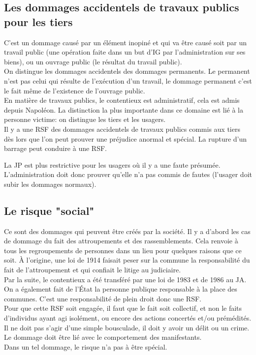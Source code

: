 \documentclass[10pt, a4paper, openany]{book}
\begin{document}
\subsection{Les dommages accidentels de travaux publics pour les tiers}

C'est un dommage causé par un élément inopiné et qui va être causé soit par un travail public (une opération faite dans un but d'IG par l'administration sur ses biens), ou un ouvrage public (le résultat du travail public). \\
On distingue les dommages accidentels des dommages permanents. Le permanent n'est pas celui qui résulte de l'exécution d'un travail, le dommage permanent c'est le fait même de l'existence de l'ouvrage public. \\
En matière de travaux publics, le contentieux est administratif, cela est admis depuis Napoléon. La distinction la plus importante dans ce domaine est lié à la personne victime: on distingue les tiers et les usagers. \\
Il y a une RSF des dommages accidentels de travaux publics commis aux tiers dès lors que l'on peut prouver une préjudice anormal et spécial. La rupture d'un barrage peut conduire à une RSF.


La JP est plus restrictive pour les usagers où il y a une faute présumée. L'administration doit donc prouver qu'elle n'a pas commis de fautes (l'usager doit subir les dommages normaux). \\

\subsection{Le risque "social"}

Ce sont des dommages qui peuvent être créés par la société. Il y a d'abord les cas de dommage du fait des attroupements et des rassemblements. Cela renvoie à tous les regroupements de personnes dans un lieu pour quelques raisons que ce soit. À l'origine, une loi de 1914 faisait peser sur la commune la responsabilité du fait de l'attroupement et qui confiait le litige au judiciaire. \\
Par la suite, le contentieux a été transféré par une loi de 1983 et de 1986 au JA. On a également fait de l'État la personne publique responsable à la place des communes. C'est une responsabilité de plein droit donc une RSF. \\
Pour que cette RSF soit engagée, il faut que le fait soit collectif, et non le faits d'individus ayant agi isolément, ou encore des actions concertés et/ou prémédités. Il ne doit pas s'agir d'une simple bousculade, il doit y avoir un délit ou un crime. Le dommage doit être lié avec le comportement des manifestants. \\
Dans un tel dommage, le risque n'a pas à être spécial. 
\end{document}
